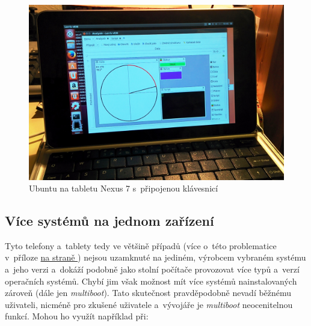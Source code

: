 \documentclass[12pt, a4paper, oneside]{article}
\newcommand{\It}{\textit}  %
\newcommand*{\attref}[1]{\hyperref[{#1}]{\uv{\nameref*{#1}} na straně \pageref{#1}}}
\begin{document}
\begin{figure}[H]
\begin{center}
\includegraphics[width=\textwidth]{img/n7_ubuntu.jpg}
\caption{Ubuntu na tabletu Nexus 7 s~připojenou klávesnicí}
\end{center}
\end{figure}


\subsection{Více systémů na jednom zařízení}
Tyto telefony a~tablety tedy ve většině případů (více o~této problematice v~příloze \attref{sec:locked}) nejsou uzamknuté na jediném, výrobcem vybraném systému a~jeho verzi a~dokáží podobně jako stolní počítače provozovat více typů a~verzí operačních systémů. Chybí jim však možnost mít více systémů nainstalovaných zároveň (dále jen \It{multiboot}). Tato skutečnost pravděpodobně nevadí běžnému uživateli, nicméně pro zkušené uživatele a~vývojáře je \It{multiboot} neocenitelnou funkcí. Mohou ho využít například při:
\end{document}
